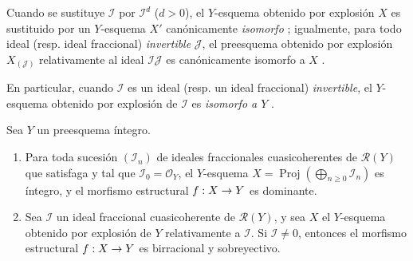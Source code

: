 \documentclass[oneside,10pt]{amsart}
\makeatletter
\renewcommand{\geq}{\geqslant}
\newcommand{\ega@arrow}[2]{\mathchoice{#1}{#2}{#2}{#2}}
\renewcommand{\to}{\ega@arrow{\longrightarrow}{\rightarrow}}
\newcommand{\oldpage}[2][]{\marginnote{\normalfont\footnotesize\textbf{#1}~|~#2}\ignorespaces}
\let\EGAOriginalLabel\label
\renewcommand{\label}[1]{\phantomsection\EGAOriginalLabel{#1}}
\makeatother
\begin{document}
Cuando se sustituye $\mathcal{I}$ por $\mathcal{I}^d$ ($d>0$), el $Y$-esquema obtenido por explosión $X$ es sustituido por un $Y$-esquema $X'$ canónicamente \emph{isomorfo} ;
igualmente, para todo ideal (resp. ideal fraccional) \emph{invertible} $\mathcal{J}$, el preesquema obtenido por explosión $X_{(\mathcal{J})}$ relativamente al ideal $\mathcal{I}\mathcal{J}$ es canónicamente isomorfo a $X$ .

En particular, cuando $\mathcal{I}$ es un ideal (resp. un ideal fraccional) \emph{invertible}, el $Y$-esquema obtenido por explosión de $\mathcal{I}$ es \emph{isomorfo a $Y$} .

\begin{proposition}[8.1.4]
\label{II.8.1.4-fr}
Sea $Y$ un preesquema íntegro.
\begin{enumerate}
    \item[\rm{(i)}] Para toda sucesión $(\mathcal{I}_n)$ de ideales fraccionales cuasicoherentes de $\mathcal{R}(Y)$ que satisfaga 
\oldpage[II]{154}
        y tal que $\mathcal{I}_0=\mathcal{O}_Y$, el $Y$-esquema $X=\operatorname{Proj}(\bigoplus_{n\geq0}\mathcal{I}_n)$ es íntegro, y el morfismo estructural $f:X\to Y$ es dominante.
    \item[\rm{(ii)}] Sea $\mathcal{I}$ un ideal fraccional cuasicoherente de $\mathcal{R}(Y)$, y sea $X$ el $Y$-esquema obtenido por explosión de $Y$ relativamente a $\mathcal{I}$.
        Si $\mathcal{I}\neq0$, entonces el morfismo estructural $f:X\to Y$ es birracional y sobreyectivo.
\end{enumerate}
\end{proposition}
\end{document}
